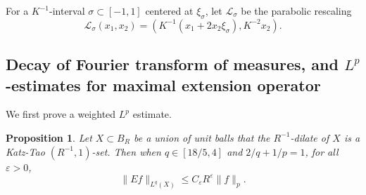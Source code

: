 \documentclass{amsart}
\numberwithin{equation}{section}
\newtheorem{proposition}[theorem]{Proposition}
\newcommand{\e}{\varepsilon}
\newcommand{\si}{\sigma}
\newcommand{\cl}{\mathcal L}
\begin{document}
\smallskip

For a $K^{-1}$-interval $\si\subset[-1,1]$ centered at $\xi_\si$, let $\cl_\si$ be the parabolic rescaling
\begin{equation}
\label{parabolic-rescaling}
    \cl_\si(x_1,x_2)=(K^{-1}(x_1+2x_2\xi_\si), K^{-2}x_2).
\end{equation}


\medskip


\subsection{Decay of Fourier transform of measures, and \texorpdfstring{$L^p$}{}-estimates for maximal extension operator}

We first prove a weighted $L^p$ estimate.


\begin{proposition}
\label{weighted-lp-prop}
Let $X\subset B_R$ be a union of unit balls that the $R^{-1}$-dilate of $X$ is a Katz-Tao $(R^{-1},1)$-set.
Then when $q\in[18/5,4]$ and $2/q+1/p=1$, for all $\e>0$,
\begin{equation}
\label{weighted-lp-esti}
    \|Ef\|_{L^q(X)}\leq C_\e R^\e\|f\|_p.
\end{equation}
\end{proposition}
\end{document}
